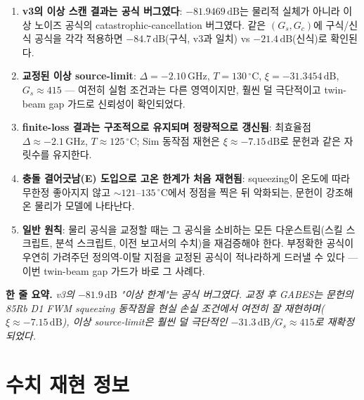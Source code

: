 \documentclass[11pt,a4paper]{article}
\newcommand{\dB}{\,\mathrm{dB}}
\newcommand{\GHz}{\,\mathrm{GHz}}
\newcommand{\degC}{\,^{\circ}\mathrm{C}}
\begin{document}
\begin{enumerate}[nosep]
\item \textbf{v3의 이상 스캔 결과는 공식 버그였다}: $-81.9469\dB$는 물리적
      실체가 아니라 이상 노이즈 공식의 catastrophic-cancellation 버그였다.
      같은 $(G_s,G_c)$에 구식/신식 공식을 각각 적용하면 $-84.7\dB$(구식,
      v3과 일치) vs $-21.4\dB$(신식)로 확인된다.
\item \textbf{교정된 이상 source-limit}: $\Delta=-2.10\GHz$, $T=130\degC$,
      $\xi=-31.3454\dB$, $G_s\approx415$ — 여전히 실험 조건과는 다른
      영역이지만, 훨씬 덜 극단적이고 twin-beam gap 가드로 신뢰성이
      확인되었다.
\item \textbf{finite-loss 결과는 구조적으로 유지되며 정량적으로 갱신됨}:
      최효율점 $\Delta\approx-2.1\GHz$, $T\approx125\degC$; Sim 동작점
      재현은 $\xi\approx-7.15\dB$로 문헌과 같은 자릿수를 유지한다.
\item \textbf{충돌 결어긋남(E) 도입으로 고온 한계가 처음 재현됨}: squeezing이
      온도에 따라 무한정 좋아지지 않고 $\sim121$--$135\degC$에서 정점을
      찍은 뒤 악화되는, 문헌이 강조해온 물리가 모델에 나타난다.
\item \textbf{일반 원칙}: 물리 공식을 교정할 때는 그 공식을 소비하는 모든
      다운스트림(스킬 스크립트, 분석 스크립트, 이전 보고서의 수치)을
      재검증해야 한다. 부정확한 공식이 우연히 가려주던 정의역-이탈 지점을
      교정된 공식이 적나라하게 드러낼 수 있다 — 이번 twin-beam gap 가드가
      바로 그 사례다.
\end{enumerate}

\noindent\textbf{한 줄 요약.} \emph{v3의 $-81.9\dB$ "이상 한계"는 공식
버그였다. 교정 후 GABES는 문헌의 85Rb D1 FWM squeezing 동작점을 현실 손실
조건에서 여전히 잘 재현하며($\xi\approx-7.15\dB$), 이상 source-limit은 훨씬
덜 극단적인 $-31.3\dB$/$G_s\approx415$로 재확정되었다.}

\appendix
\section{수치 재현 정보}
\end{document}
